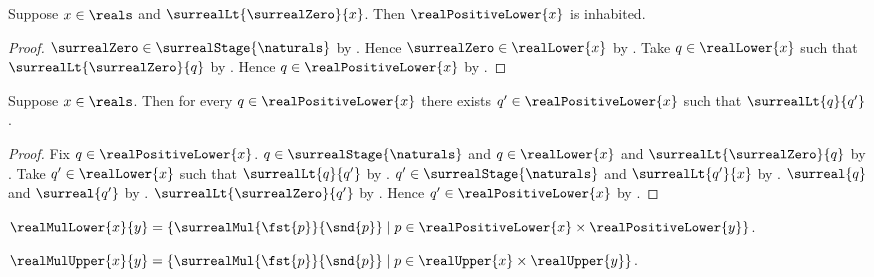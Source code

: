 \begin{proposition}\label{surreal_real_positive_lower_inhabited}
    Suppose $x\in\reals$ and $\surrealLt{\surrealZero}{x}$.
    Then $\realPositiveLower{x}$ is inhabited.
\end{proposition}
\begin{proof}
    $\surrealZero\in\surrealStage{\naturals}$
        by
        .
    Hence $\surrealZero\in\realLower{x}$
        by .
    Take $q\in\realLower{x}$ such that
        $\surrealLt{\surrealZero}{q}$
        by .
    Hence $q\in\realPositiveLower{x}$
        by
        .
\end{proof}

\begin{proposition}\label{surreal_real_positive_lower_no_maximum}
    Suppose $x\in\reals$.
    Then for every $q\in\realPositiveLower{x}$ there exists
        $q'\in\realPositiveLower{x}$ such that $\surrealLt{q}{q'}$.
\end{proposition}
\begin{proof}
    Fix $q\in\realPositiveLower{x}$.
    $q\in\surrealStage{\naturals}$ and
        $q\in\realLower{x}$ and $\surrealLt{\surrealZero}{q}$
        by
        .
    Take $q'\in\realLower{x}$ such that $\surrealLt{q}{q'}$
        by .
    $q'\in\surrealStage{\naturals}$ and $\surrealLt{q'}{x}$
        by .
    $\surreal{q}$ and $\surreal{q'}$
        by
        .
    $\surrealLt{\surrealZero}{q'}$
        by
        .
    Hence $q'\in\realPositiveLower{x}$
        by .
\end{proof}

\begin{definition}\label{surreal_real_mul_lower}
    $\realMulLower{x}{y}=
        \{\surrealMul{\fst{p}}{\snd{p}}
            \mid p\in\realPositiveLower{x}\times
                \realPositiveLower{y}\}$.
\end{definition}

\begin{definition}\label{surreal_real_mul_upper}
    $\realMulUpper{x}{y}=
        \{\surrealMul{\fst{p}}{\snd{p}}
            \mid p\in\realUpper{x}\times\realUpper{y}\}$.
\end{definition}

